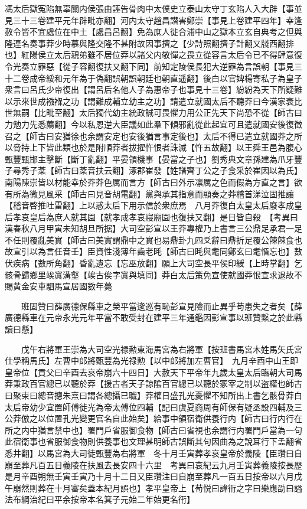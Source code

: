 馮太后獄寃陷無辜關内侯張由誣告骨肉中太僕史立泰山太守丁玄陷人入大辟【事並見三十三卷建平元年辟毗亦翻】河内太守趙昌譛害鄭崇【事見上卷建平四年】幸逢赦令皆不宜處位在中土【處昌呂翻】免為庶人徙合浦中山之獄本立玄自典考之但與隆連名奏事莽少時慕與隆交隆不甚附故因事擠之【少詩照翻擠子計翻又牋西翻排也】紅陽侯立太后親弟雖不居位莽以諸父内敬憚之畏立從容言太后令已不得肆意復令光奏立罪惡【從子容翻復扶又翻下同】前知定陵侯長犯大逆罪為言誤朝【事見三十二卷成帝綏和元年為于偽翻誤朝誤朝廷也朝直遥翻】後白以官婢楊寄私子為皇子衆言曰呂氏少帝復出【謂呂后名他人子為惠帝子也事見十三卷】紛紛為天下所疑難以示來世成襁褓之功【謂難成輔立幼主之功】請遣立就國太后不聽莽曰今漢家衰比世無嗣【比毗至翻】太后獨代幼主統政誠可畏懼力用公正先天下尚恐不從【師古曰力勉力先悉薦翻】今以私恩逆大臣議如此羣下傾邪亂從此起宜可且遣就國安後復徵召之【師古曰安猶徐也余謂安定也安後猶言事定後也】太后不得已遣立就國莽之所以脅持上下皆此類也於是附順莽者拔擢忤恨者誅滅【忤五故翻】以王舜王邑為腹心甄豐甄邯主擊斷【斷丁亂翻】平晏領機事【晏當之子也】劉秀典文章孫建為爪牙豐子尋秀子棻【師古曰棻音扶云翻】涿郡崔發【姓譜齊丁公之子食采於崔因以為氏】南陽陳崇皆以材能幸於莽莽色厲而言方【師古曰外示凛厲之色而假為方直之言】欲有所為微見風采【師古曰見音胡電翻】黨與承其指意而顯奏之莽稽首涕泣固推讓【稽音啓推吐雷翻】上以惑太后下用示信於衆庶焉　八月莽復白太皇太后廢孝成皇后孝哀皇后為庶人就其園【就孝成孝哀寢廟園也復扶又翻】是日皆自殺　【考異曰漢春秋八月甲寅未知胡旦所据】大司空彭宣以王莽專權乃上書言三公鼎足承君一足不任則覆亂美實【師古曰美實謂鼎中之實也易鼎卦九四爻辭曰鼎折足覆公餗餗食也故宣引以為言任音壬】臣資性淺薄年齒老眊【師古曰眊與耄同鄭玄曰耄惽忘也】數伏疾病【數所角翻】昏亂遺忘【忘巫放翻】願上大司空長平侯印綬【上時掌翻】乞骸骨歸鄉里竢寘溝壑【竢古俟字寘與填同】莽白太后策免宣使就國莽恨宣求退故不賜黄金安車駟馬宣居國數年薨

　　班固贊曰薛廣德保縣車之榮平當逡巡有恥彭宣見險而止異乎苟患失之者矣【薛廣德縣車在元帝永光元年平當不敢受封在建平三年通鑑因彭宣事以班贊繫之於此縣讀曰懸】

　　戊午右將軍王崇為大司空光禄勲東海馬宮為右將軍【按班書馬宮木姓馬矢氏宮仕學稱馬氏】左曹中郎將甄豐為光禄勲【以中郎將加左曹官】　九月辛酉中山王即皇帝位【貢父曰辛酉去哀帝崩六十四日】大赦天下平帝年九歲太皇太后臨朝大司馬莽秉政百官總已以聽於莽【援古者天子諒隂百官總已以聽於冢宰之制以盗權也師古曰聚束曰總音摠朱熹曰謂各總攝已職】莽權日盛孔光憂懼不知所出上書乞骸骨莽白太后帝幼少宜置師傅徙光為帝太傅位四輔【記曰虞夏商周有師保有疑丞設四輔及三公莽倣之以位置孔光變更官名自此始矣】給事中領宿衛供養行内【師古曰行内行在所之内中猶言禁中也】署門戶省服御食物【師古曰省視也余謂行内署門戶當為一句此宿衛事也省服御食物則供養事也文理甚明師古誤斷其句因曲為之說耳行下孟翻省悉井翻】以馬宮為大司徒甄豐為右將軍　冬十月壬寅葬孝哀皇帝於義陵【臣瓚曰自崩至葬凡百五日義陵在扶風去長安四十六里　考異曰哀紀云九月壬寅葬義陵按長歷是月辛酉朔無壬寅壬寅乃十月十二日又臣瓚注曰自崩至葬凡一百五日按帝以六月戊午崩然則葬在十月審矣蓋本紀月誤也】孝平皇帝上【荀悦曰諱衎之字曰樂應劭曰謚法布綱治紀曰平余按帝本名箕子元始二年始更名衎】

